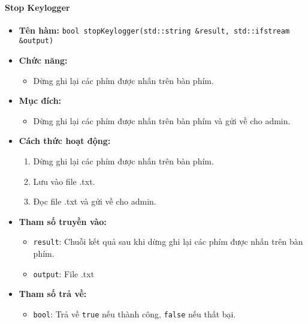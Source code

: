 \paragraph{Stop Keylogger}
\begin{itemize}
    \item \textbf{Tên hàm:} \texttt{bool stopKeylogger(std::string \&result, std::ifstream \&output)}
    \item \textbf{Chức năng:}
    \begin{itemize}
        \item Dừng ghi lại các phím được nhấn trên bàn phím.
    \end{itemize}
    \item \textbf{Mục đích:}
    \begin{itemize}
        \item Dừng ghi lại các phím được nhấn trên bàn phím và gửi về cho admin.
    \end{itemize}
    \item \textbf{Cách thức hoạt động:}
    \begin{enumerate}
        \item Dừng ghi lại các phím được nhấn trên bàn phím.
        \item Lưu vào file .txt.
        \item Đọc file .txt và gửi về cho admin.
    \end{enumerate}
    \item \textbf{Tham số truyền vào:}
    \begin{itemize}
        \item \texttt{result}: Chuỗi kết quả sau khi dừng ghi lại các phím được nhấn trên bàn phím.
        \item \texttt{output}: File .txt
    \end{itemize}
    \item \textbf{Tham số trả về:}
    \begin{itemize}
        \item \texttt{bool}: Trả về \texttt{true} nếu thành công, \texttt{false} nếu thất bại.
    \end{itemize}
\end{itemize}